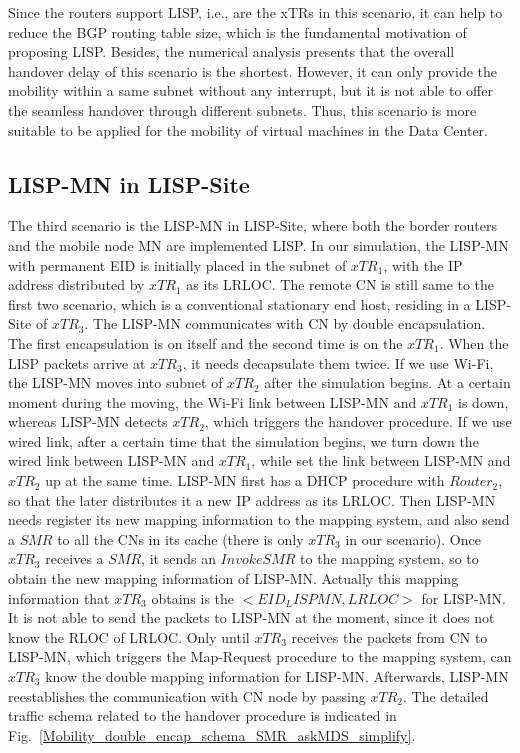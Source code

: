 Since the routers support LISP, i.e., are the xTRs in this scenario, it can help to reduce the BGP routing table size, which is the fundamental motivation of proposing LISP. Besides, the numerical analysis presents that the overall handover delay of this scenario is the shortest. However, it can only provide the mobility within a same subnet without any interrupt, but it is not able to offer the seamless handover through different subnets. Thus, this scenario is more suitable to be applied for the mobility of virtual machines in the Data Center.

\subsection{LISP-MN in LISP-Site}
\label{sec:ns3_analysis_lispmn_xTR}
The third scenario is the LISP-MN in LISP-Site, where both the border routers and the mobile node MN are implemented LISP. In our simulation, the LISP-MN with permanent EID is initially placed in the subnet of $xTR_1$, with the IP address distributed by $xTR_1$ as its LRLOC. The remote CN is still same to the first two scenario, which is a conventional stationary end host, residing in a LISP-Site of $xTR_3$. The LISP-MN communicates with CN by double encapsulation. The first encapsulation is on itself and the second time is on the $xTR_1$. When the LISP packets arrive at $xTR_3$, it needs decapsulate them twice. If we use Wi-Fi, the LISP-MN moves into subnet of $xTR_2$ after the simulation begins. At a certain moment during the moving, the Wi-Fi link between LISP-MN and $xTR_1$ is down, whereas LISP-MN detects $xTR_2$, which triggers the handover procedure. If we use wired link, after a certain time that the simulation begins, we turn down the wired link between LISP-MN and $xTR_1$, while set the link between LISP-MN and $xTR_2$ up at the same time. LISP-MN first has a DHCP procedure with $Router_2$, so that the later distributes it a new IP address as its LRLOC. Then LISP-MN needs register its new mapping information to the mapping system, and also send a $SMR$ to all the CNs in its cache (there is only $xTR_3$ in our scenario). Once $xTR_3$ receives a $SMR$, it sends an $Invoke SMR$ to the mapping system, so to obtain the new mapping information of LISP-MN. Actually this mapping information that $xTR_3$ obtains is the $<EID_LISPMN, LRLOC>$ for LISP-MN. It is not able to send the packets to LISP-MN at the moment, since it does not know the RLOC of LRLOC. Only until $xTR_3$ receives the packets from CN to LISP-MN, which triggers the Map-Request procedure to the mapping system, can $xTR_3$ know the double mapping information for LISP-MN. Afterwards, LISP-MN reestablishes the communication with CN node by passing $xTR_2$. The detailed traffic schema related to the handover procedure is indicated in Fig.~\ref{Mobility_double_encap_schema_SMR_askMDS_simplify}.
